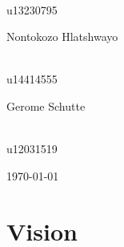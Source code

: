 \documentclass[a4paper,12pt]{article}
\begin{document}
\begin{titlepage}
\begin{center}
\begin{minipage}{0.4\textwidth}
\begin{flushright} \large
\emph{} \\
u13230795  
\end{flushright}
\end{minipage}
\begin{minipage}{0.4\textwidth}
\begin{flushleft} \large
Nontokozo Hlatshwayo
\end{flushleft}
\end{minipage}
\begin{minipage}{0.4\textwidth}
\begin{flushright} \large
\emph{} \\
u14414555
\end{flushright}
\end{minipage}
\begin{minipage}{0.4\textwidth}
\begin{flushleft} \large
Gerome Schutte
\end{flushleft}
\end{minipage}
\begin{minipage}{0.4\textwidth}
\begin{flushright} \large
\emph{} \\
u12031519
\end{flushright}
\end{minipage}
\vfill

{\large \today}
\end{center}
\end{titlepage}
\footnotesize
\normalsize

%
%

\tableofcontents
\newpage

%
%
%

\section{Vision}
\end{document}
